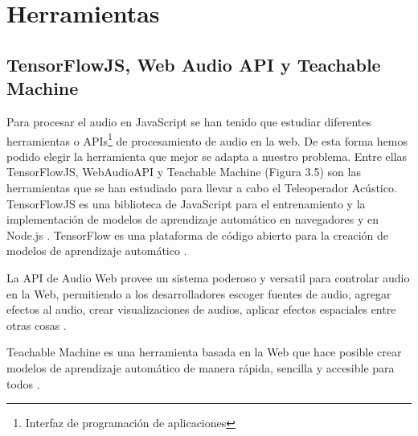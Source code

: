 \section{Herramientas}
\subsection{TensorFlowJS, Web Audio API y Teachable Machine}
Para procesar el audio en JavaScript se han tenido que estudiar diferentes herramientas o APIs\footnote{Interfaz de programación de aplicaciones} de procesamiento de audio en la web. De esta forma hemos podido elegir la herramienta que mejor se adapta a nuestro problema.
Entre ellas TensorFlowJS, WebAudioAPI y Teachable Machine (Figura 3.5) son las herramientas que se han estudiado para llevar a cabo el Teleoperador Acústico.
\\
TensorFlowJS es una biblioteca de JavaScript para el entrenamiento y la implementación de modelos de aprendizaje automático en navegadores y en Node.js . TensorFlow es una plataforma de código abierto para la creación de modelos de aprendizaje automático \cite{tfjs}.

La API de Audio Web provee un sistema poderoso y versatil para controlar audio en la Web, permitiendo a los desarrolladores escoger fuentes de audio, agregar efectos al audio, crear visualizaciones de audios, aplicar efectos espaciales entre otras cosas \cite{waa}.

Teachable Machine es una herramienta basada en la Web que hace posible crear modelos de aprendizaje automático de manera rápida, sencilla y accesible para todos \cite{tm}.

